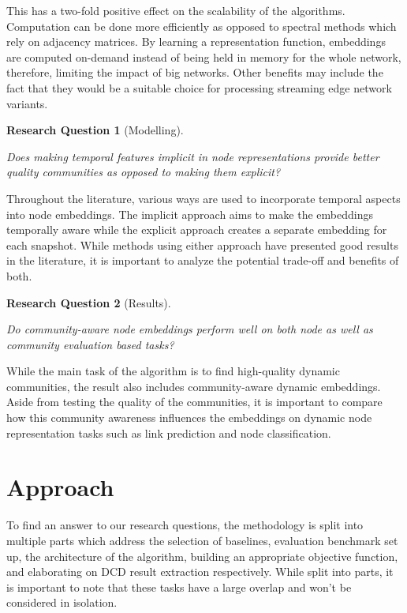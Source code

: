 \documentclass[
acmsmall,
nonacm,
screen,
acmthm]{../../scripts/pandoc/templates/acmart}
\newtheorem{rqq}{Research Question}
\begin{document}
This has a two-fold positive effect on the scalability of the
algorithms. Computation can be done more efficiently as opposed to
spectral methods which rely on adjacency matrices. By learning a
representation function, embeddings are computed on-demand instead of
being held in memory for the whole network, therefore, limiting the
impact of big networks. Other benefits may include the fact that they
would be a suitable choice for processing streaming edge network
variants.

\begin{rqq}[Modelling]\label{rqq:rq3} 

\emph{Does making temporal features implicit in node representations
provide better quality communities as opposed to making them explicit?}

\end{rqq}

Throughout the literature, various ways are used to incorporate temporal
aspects into node embeddings. The implicit approach aims to make the
embeddings temporally aware while the explicit approach creates a
separate embedding for each snapshot. While methods using either
approach have presented good results in the literature, it is important
to analyze the potential trade-off and benefits of both.

\begin{rqq}[Results]\label{rqq:rq4} 

\emph{Do community-aware node embeddings perform well on both node as
well as community evaluation based tasks?}

\end{rqq}

While the main task of the algorithm is to find high-quality dynamic
communities, the result also includes community-aware dynamic
embeddings. Aside from testing the quality of the communities, it is
important to compare how this community awareness influences the
embeddings on dynamic node representation tasks such as link prediction
and node classification.

\hypertarget{approach}{%
\section{Approach}\label{approach}}

To find an answer to our research questions, the methodology is split
into multiple parts which address the selection of baselines, evaluation
benchmark set up, the architecture of the algorithm, building an
appropriate objective function, and elaborating on DCD result extraction
respectively. While split into parts, it is important to note that these
tasks have a large overlap and won't be considered in isolation.
\end{document}
